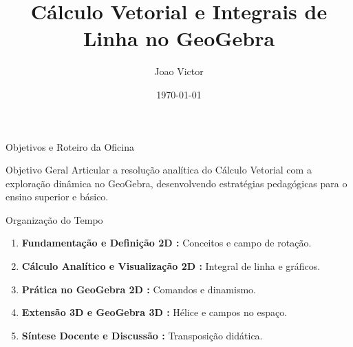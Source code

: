 \documentclass[aspectratio=169, 13pt]{beamer}
\title[Cálculo Vetorial com GeoGebra]{Cálculo Vetorial e Integrais de Linha no GeoGebra}
\author[Joao Victor]{Joao Victor}
\institute[Licenciatura em Matemática]{Graduando Licenciatura em Matemática \\ \texttt{2024007388@ifam.edu.br}}
\date{\today}
\begin{document}
	
	\begin{frame}
		\titlepage
	\end{frame}
	
	\begin{frame}{Objetivos e Roteiro da Oficina }
		\begin{block}{Objetivo Geral}
			Articular a resolução analítica do Cálculo Vetorial com a exploração dinâmica no GeoGebra, desenvolvendo estratégias pedagógicas para o ensino superior e básico.
		\end{block}
		
		\vspace{0.2cm}
		\begin{block}{Organização do Tempo}
			\begin{enumerate}
				\item \textbf{Fundamentação e Definição 2D :} Conceitos e campo de rotação.
				\item \textbf{Cálculo Analítico e Visualização 2D :} Integral de linha e gráficos.
				\item \textbf{Prática no GeoGebra 2D :} Comandos e dinamismo.
				\item \textbf{Extensão 3D e GeoGebra 3D :} Hélice e campos no espaço.
				\item \textbf{Síntese Docente e Discussão :} Transposição didática.
			\end{enumerate}
		\end{block}
	\end{frame}
	
\end{document}
